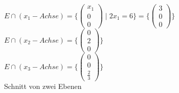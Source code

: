 $E \cap (x_1-Achse) = \{ \left( \begin{array}{c}x_1\\0\\0 \end{array} \right) \mid 2x_1 = 6 \} = \{ \left( \begin{array}{c}3\\0\\0 \end{array} \right) \}$
$E \cap (x_2-Achse) = \{ \left( \begin{array}{c}0\\2\\0 \end{array} \right) \}$\\
$E \cap (x_3-Achse) = \{ \left( \begin{array}{c}0\\0\\\frac{2}{3} \end{array} \right) \}$\\
Schnitt von zwei Ebenen